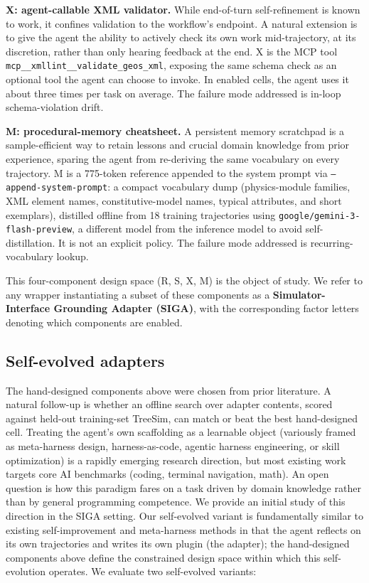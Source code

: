 \documentclass{article}
\begin{document}
\textbf{X: agent-callable XML validator.} While end-of-turn self-refinement is known to work, it confines validation to the workflow's endpoint. A natural extension is to give the agent the ability to actively check its own work mid-trajectory, at its discretion, rather than only hearing feedback at the end. X is the MCP tool \texttt{mcp\_\_xmllint\_\_validate\_geos\_xml}, exposing the same schema check as an optional tool the agent can choose to invoke. In enabled cells, the agent uses it about three times per task on average. The failure mode addressed is in-loop schema-violation drift.

\textbf{M: procedural-memory cheatsheet.} A persistent memory scratchpad is a sample-efficient way to retain lessons and crucial domain knowledge from prior experience, sparing the agent from re-deriving the same vocabulary on every trajectory. M is a 775-token reference appended to the system prompt via \texttt{--append-system-prompt}: a compact vocabulary dump (physics-module families, XML element names, constitutive-model names, typical attributes, and short exemplars), distilled offline from 18 training trajectories using \texttt{google/gemini-3-flash-preview}, a different model from the inference model to avoid self-distillation. It is not an explicit policy. The failure mode addressed is recurring-vocabulary lookup.

This four-component design space (R, S, X, M) is the object of study. We refer to any wrapper instantiating a subset of these components as a \textbf{Simulator-Interface Grounding Adapter (SIGA)}, with the corresponding factor letters denoting which components are enabled.

\subsection{Self-evolved adapters}
\label{subsec:self-evolved}

The hand-designed components above were chosen from prior literature. A natural follow-up is whether an offline search over adapter contents, scored against held-out training-set TreeSim, can match or beat the best hand-designed cell. Treating the agent's own scaffolding as a learnable object (variously framed as meta-harness design, harness-as-code, agentic harness engineering, or skill optimization) is a rapidly emerging research direction, but most existing work targets core AI benchmarks (coding, terminal navigation, math). An open question is how this paradigm fares on a task driven by domain knowledge rather than by general programming competence. We provide an initial study of this direction in the SIGA setting. Our self-evolved variant is fundamentally similar to existing self-improvement and meta-harness methods in that the agent reflects on its own trajectories and writes its own plugin (the adapter); the hand-designed components above define the constrained design space within which this self-evolution operates. We evaluate two self-evolved variants:
\end{document}
